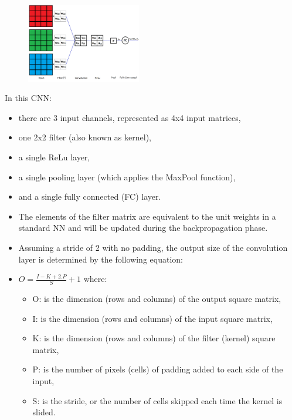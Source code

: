 \begin{vbframe}

 \begin{figure}
    \centering
    \includegraphics[width=5cm]{figure/3channel.png}
  \end{figure}

In this CNN:
    \begin{itemize}
       \item there are 3 input channels, represented as 4x4 input matrices, 
       \item one 2x2 filter (also known as kernel), 
       \item a single ReLu layer,
       \item a single pooling layer (which applies the MaxPool function),
       \item and a single fully connected (FC) layer.
    \end{itemize}

    \begin{itemize}
       \item The elements of the filter matrix are equivalent to the unit weights in a standard NN and will be updated during the backpropagation phase.
       \item Assuming a stride of 2 with no padding, the output size of the convolution layer is determined by the following equation:
       \item $ O = \frac{I - K + 2.P}{S} + 1$ where: 
    \begin{itemize}
       \item O: is the dimension (rows and columns) of the output square matrix, 
       \item I: is the dimension (rows and columns) of the input square matrix,
       \item K: is the dimension (rows and columns) of the filter (kernel) square matrix, 
       \item P: is the number of pixels (cells) of padding added to each side of the input,
       \item S: is the stride, or the number of cells skipped each time the kernel is slided.
    \end{itemize}
    \end{itemize}


\end{vbframe}
